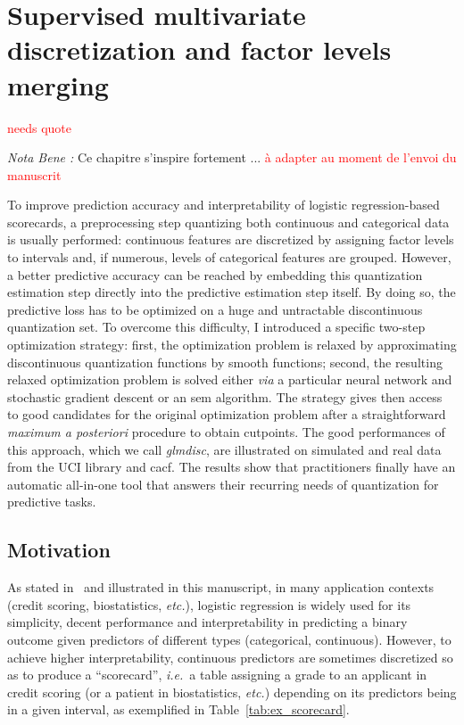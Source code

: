 \chapter{Supervised multivariate discretization and factor levels merging} \label{chap4}

\minitoc

\textcolor{red}{needs quote}

\textit{Nota Bene :} Ce chapitre s'inspire fortement ... \textcolor{red}{à adapter au moment de l'envoi du manuscrit}

\bigskip


To improve prediction accuracy and interpretability of logistic regression-based scorecards, a preprocessing step quantizing both continuous and categorical data is usually performed: continuous features are discretized by assigning factor levels to intervals and, if numerous, levels of categorical features are grouped. However, a better predictive accuracy can be reached by embedding this quantization estimation step directly into the predictive estimation step itself. By doing so, the predictive loss has to be optimized on a huge and untractable discontinuous quantization set. To overcome this difficulty, I introduced a specific two-step optimization strategy: first, the optimization problem is relaxed by approximating discontinuous quantization functions by smooth functions; second, the resulting relaxed optimization problem is solved either \textit{via} a particular neural network and stochastic gradient descent or an \gls{sem} algorithm. The strategy gives then access to good candidates for the original optimization problem after a straightforward \textit{maximum a posteriori} procedure to obtain cutpoints. The good performances of this approach, which we call \textit{glmdisc}, are illustrated on simulated and real data from the UCI library and \gls{cacf}. The results show that practitioners finally have an automatic all-in-one tool that answers their recurring needs of quantization for predictive tasks.
 
\section{Motivation}

As stated in~\cite{hosmer2013applied} and illustrated in this manuscript, in many application contexts (credit scoring, biostatistics, {\it etc.}), logistic regression is widely used for its simplicity, decent performance and interpretability in predicting a binary outcome given predictors of different types (categorical, continuous). However, to achieve  higher interpretability, continuous predictors are sometimes discretized so as to produce a ``scorecard'', \textit{i.e.}\ a table assigning a grade to an applicant in credit scoring (or a patient in biostatistics, {\it etc.}) depending on its predictors being in a given interval, as exemplified in Table~\ref{tab:ex_scorecard}.

